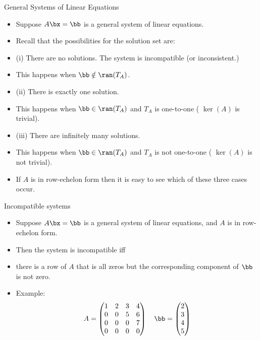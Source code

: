 \documentclass{beamer}
\begin{document}

\begin{frame}{General Systems of Linear Equations}

\begin{itemize}
\item Suppose $A\bx=\bb$ is a general system of linear equations.
\item Recall that the possibilities for the solution set are:
\item (i) There are no solutions. The system is incompatible (or inconsistent.)
\item This happens when $\bb\notin\ran(T_A)$.
\item (ii) There is exactly one solution.
\item This happens when $\bb\in\ran(T_A)$  and $T_A$ is one-to-one ( $\ker(A)$ is trivial).
\item (iii) There are infinitely many solutions.
\item This happens when $\bb\in\ran(T_A)$  and $T_A$ is not one-to-one ( $\ker(A)$ is not trivial).
\item If $A$ is in row-echelon form then it is easy to see which of these three cases occur.
\end{itemize}
\end{frame}


\begin{frame}{Incompatible systems}

\begin{itemize}
\item Suppose $A\bx=\bb$ is a general system of linear equations, and $A$ is in row-echelon form.
\item Then the system is incompatible iff
\item there is a row of $A$ that is all zeros but the corresponding component of $\bb$ is not zero.
\item Example:
$$
A =
\begin{pmatrix}
1 & 2 & 3 & 4 \\
0 & 0 & 5 & 6 \\
0 & 0 & 0 & 7 \\
0 & 0 & 0 & 0 \\
\end{pmatrix}
\quad
\bb=
\begin{pmatrix}
2 \\ 3 \\ 4 \\ 5
\end{pmatrix}
$$

\end{itemize}
\end{frame}
\end{document}
